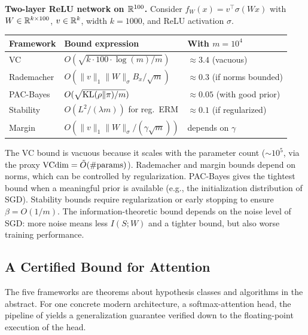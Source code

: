 \begin{computational}
\textbf{Two-layer ReLU network on $\mathbb{R}^{100}$.}
Consider $f_W(x) = v^\top \sigma(Wx)$ with $W \in \mathbb{R}^{k \times 100}$,
$v \in \mathbb{R}^k$, width $k = 1000$, and ReLU activation $\sigma$.

\smallskip
\begin{tabular}{@{}lll@{}}
\toprule
\textbf{Framework} & \textbf{Bound expression} & \textbf{With $m=10^4$} \\
\midrule
VC & $O(\sqrt{k \cdot 100 \cdot \log(m) / m})$ & $\approx 3.4$ (vacuous) \\
Rademacher & $O(\|v\|_1 \|W\|_\sigma B_x / \sqrt{m})$
  & $\approx 0.3$ (if norms bounded) \\
PAC-Bayes & $O(\sqrt{\mathrm{KL}(\rho\|\pi)/m})$
  & $\approx 0.05$ (with good prior) \\
Stability & $O(L^2/(\lambda m))$ for reg.\ ERM
  & $\approx 0.1$ (if regularized) \\
Margin & $O(\|v\|_1 \|W\|_\sigma / (\gamma\sqrt{m}))$
  & depends on $\gamma$ \\
\bottomrule
\end{tabular}

\smallskip
The VC bound is vacuous because it scales with the parameter count
($\sim 10^5$, via the proxy $\mathrm{VCdim} = \tilde{O}(\#\text{params})$).
Rademacher and margin bounds depend on norms, which can be controlled by
regularization.  PAC-Bayes gives the tightest bound when a meaningful
prior is available (e.g., the initialization distribution of SGD).
Stability bounds require regularization or early stopping to
ensure~$\beta = O(1/m)$.  The information-theoretic bound depends on the
noise level of SGD: more noise means less $I(S;W)$ and a tighter bound,
but also worse training performance.
\end{computational}


\subsection{A Certified Bound for Attention}
\label{sec:certified-attention}

The five frameworks are theorems about hypothesis classes and algorithms in
the abstract.  For one concrete modern architecture, a softmax-attention
head, the pipeline of  yields a
generalization guarantee verified down to the floating-point execution of the
head.

